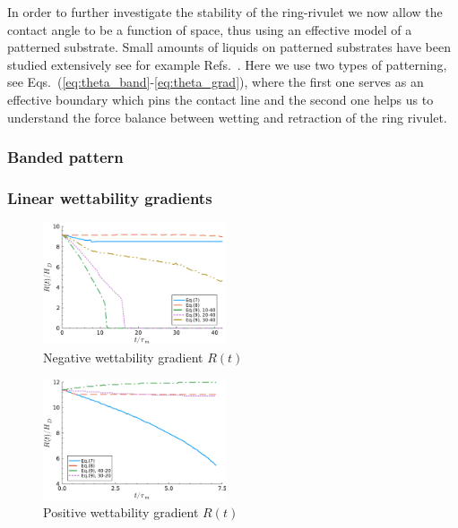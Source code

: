 \documentclass[twoside,twocolumn,9pt]{article}
\begin{document}
In order to further investigate the stability of the ring-rivulet we now allow the contact angle to be a function of space, thus using an effective model of a patterned substrate. 
Small amounts of liquids on patterned substrates have been studied extensively see for example Refs.~\cite{savvaDropletMotionInclined2013, vellingiriDropletSpreadingChemically2011, wangWettingEffectPatterned2023, wuInvestigationEquilibriumDroplet2019}.
Here we use two types of patterning, see Eqs.~(\ref{eq:theta_band}-\ref{eq:theta_grad}), where the first one serves as an effective boundary which pins the contact line and the second one helps us to understand the force balance between wetting and retraction of the ring rivulet.

\subsubsection{Banded pattern}\label{subsubsec:banded}

\subsubsection{Linear wettability gradients}\label{subsubsec:linwettgrad}
\begin{figure}
    \centering
    \includegraphics[width=0.48\textwidth]{assets/radius_time_gradient_negative.pdf}
    \caption{Negative wettability gradient $R(t)$}
    \label{fig:negativewetgrad}
\end{figure}

\begin{figure}
    \centering
    \includegraphics[width=0.48\textwidth]{assets/radius_time_gradient_positive.pdf}
    \caption{Positive wettability gradient $R(t)$}
    \label{fig:negativewetgrad}
\end{figure}
\end{document}
